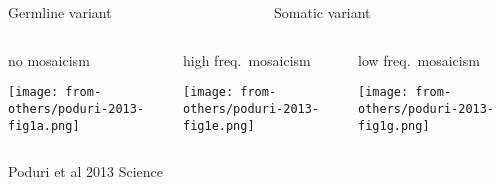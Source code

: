 \documentclass[usenames,dvipsnames]{beamer}
\begin{document}
\begin{frame}
\begin{columns}[t]
\begin{column}{0.3\textwidth}
\begin{center}
Germline variant
\end{center}
\end{column}

\begin{column}{0.7\textwidth}
\begin{center}
Somatic variant
\end{center}
\end{column}
\end{columns}
\begin{columns}[t]
\begin{column}{0.3\textwidth}
\begin{center}
	\footnotesize no mosaicism
\end{center}

\texttt{[image: from-others/poduri-2013-fig1a.png]}
\begin{center}
\end{center}
\end{column}

\begin{column}{0.3\columnwidth}
\begin{center}
	\footnotesize high freq.~mosaicism
\end{center}

\texttt{[image: from-others/poduri-2013-fig1e.png]}
\end{column}
\begin{column}{0.3\columnwidth}
\begin{center}
	\footnotesize low freq.~mosaicism
\end{center}

\texttt{[image: from-others/poduri-2013-fig1g.png]}
\end{column}
\end{columns}
{\tiny Poduri et al 2013 Science}
\end{frame}
\end{document}
